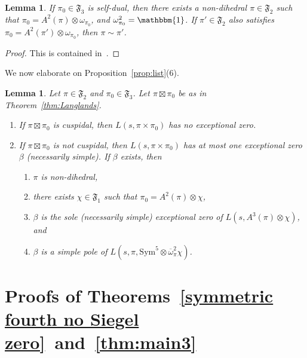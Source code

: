 \documentclass[11pt]{amsart}
\newtheorem{lemma}[theorem]{Lemma}
\theoremstyle{remark}
\newcommand{\Sym}{\mathrm{Sym}}
\renewcommand{\bar}{\overline}
\numberwithin{equation}{section}
\begin{document}
\begin{lemma}
\label{lem:exercise}
If $\pi_0\in\mathfrak{F}_3$ is self-dual, then there exists a non-dihedral $\pi\in\mathfrak{F}_2$ such that $\pi_0=A^2(\pi)\otimes\omega_{\pi_0}$, and $\omega_{\pi_0}^2=\mathbbm{1}$.  If $\pi'\in\mathfrak{F}_2$ also satisfies $\pi_0=A^2(\pi')\otimes\omega_{\pi_0}$, then $\pi\sim\pi'$.
\end{lemma}
\begin{proof}
This is contained in~\cite[Theorem A]{Ramakrishnan_exercise}.
\end{proof}

We now elaborate on Proposition~\ref{prop:list}(6).

\begin{lemma}\cite[Theorems 1 and 2]{Luo}
\label{lem:Luo}
Let $\pi\in\mathfrak{F}_2$ and $\pi_0\in\mathfrak{F}_3$.  Let $\pi\boxtimes\pi_0$ be as in Theorem~\ref{thm:Langlands}.
\begin{enumerate}
	\item If $\pi\boxtimes\pi_0$ is cuspidal, then $L(s,\pi\times\pi_0)$ has no exceptional zero.
	\item If $\pi\boxtimes\pi_0$ is not cuspidal, then $L(s,\pi\times\pi_0)$ has at most one exceptional zero $\beta$ (necessarily simple).  If $\beta$ exists, then
	\begin{enumerate}
	\item $\pi$ is non-dihedral,
	\item there exists $\chi\in\mathfrak{F}_1$ such that $\pi_0=A^2(\pi)\otimes\chi$,
	\item $\beta$ is the sole (necessarily simple) exceptional zero of $L(s,A^3(\pi)\otimes\chi)$, and
	\item $\beta$ is a simple pole of $L(s,\pi,\Sym^5\otimes \bar{\omega}_{\pi}^2\chi)$.
	\end{enumerate}
\end{enumerate}
\end{lemma}

\section{Proofs of Theorems~\ref{symmetric fourth no Siegel zero}~and~\ref{thm:main3}}
\label{sec:proofs_Sym4+self-twist}
\end{document}
